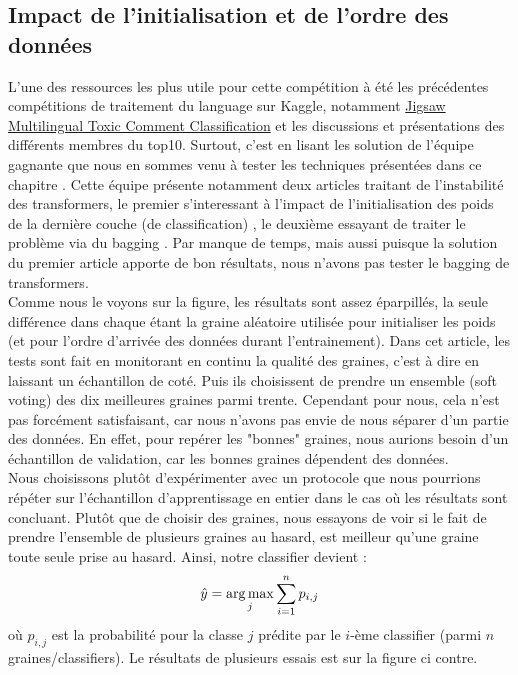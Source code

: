 \subsection{Impact de l'initialisation et de l'ordre des données}
L'une des ressources les plus utile pour cette compétition à été les précédentes compétitions de traitement du language sur Kaggle, notamment \href{https://www.kaggle.com/c/jigsaw-multilingual-toxic-comment-classification/overview}{Jigsaw Multilingual Toxic Comment Classification} et les discussions et présentations des différents membres du top10. Surtout, c'est en lisant les solution de l'équipe gagnante que nous en sommes venu à tester les techniques présentées dans ce chapitre . Cette équipe présente notamment deux articles traitant de l'instabilité des transformers, le premier s'interessant à l'impact de l'initialisation des poids de la dernière couche (de classification) , le deuxième essayant de traiter le problème via du bagging . Par manque de temps, mais aussi puisque la solution du premier article apporte de bon résultats, nous n'avons pas tester le bagging de transformers. \\
Comme nous le voyons sur la figure, les résultats sont assez éparpillés, la seule différence dans chaque étant la graine aléatoire utilisée pour initialiser les poids (et pour l'ordre d'arrivée des données durant l'entrainement). Dans cet article, les tests sont fait en monitorant en continu la qualité des graines, c'est à dire en laissant un échantillon de coté. Puis ils choisissent de prendre un ensemble (soft voting) des dix meilleures graines parmi trente. Cependant pour nous, cela n'est pas forcément satisfaisant, car nous n'avons pas envie de nous séparer d'un partie des données. En effet, pour repérer les "bonnes" graines, nous aurions besoin d'un échantillon de validation, car les bonnes graines dépendent des données. \\
Nous choisissons plutôt d'expérimenter avec un protocole que nous pourrions répéter sur l'échantillon d'apprentissage en entier dans le cas où les résultats sont concluant. Plutôt que de choisir des graines, nous essayons de voir si le fait de prendre l'ensemble de plusieurs graines au hasard, est meilleur  qu'une graine toute seule prise au hasard. Ainsi, notre classifier devient : $$ \hat y = \operatorname*{arg\,max}_j \sum_{i=1}^n p_{i,j} $$ où $p_{i,j}$ est la probabilité pour la classe $j$ prédite par le $i$-ème classifier (parmi $n$ graines/classifiers). Le résultats de plusieurs essais est sur la figure ci contre.

